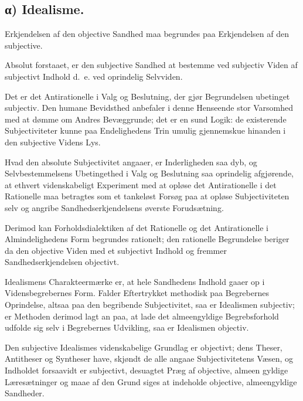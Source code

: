 \documentclass[12pt]{book}
\newcommand{\opage}[1]{\marginnote{\footnotesize\textit{[#1]}}}
\begin{document}
\opage{63} %
\subsection*{α) Idealisme.}

Erkjendelsen af den objective Sandhed maa begrundes paa Erkjendelsen
af den subjective.

Absolut forstaaet, er den subjective Sandhed at bestemme ved
subjectiv Viden af subjectivt Indhold d.~e. ved oprindelig
Selvviden.

Det er det Antirationelle i Valg og Beslutning, der gjør
Begrundelsen ubetinget subjectiv. Den humane Bevidsthed anbefaler i
denne Henseende stor Varsomhed med at dømme om Andres Bevæggrunde;
det er en sund Logik: de existerende Subjectiviteter kunne paa
Endelighedens Trin umulig gjennemskue hinanden i den subjective
Videns Lys.

Hvad den absolute Subjectivitet angaaer, er Inderligheden saa dyb,
og Selvbestemmelsens Ubetingethed i Valg og Beslutning saa
oprindelig afgjørende, at ethvert videnskabeligt Experiment med at
opløse det Antirationelle i det Rationelle maa betragtes som et
tankeløst Forsøg paa at opløse Subjectiviteten selv og angribe
Sandhedserkjendelsens øverste Forudsætning.

Derimod kan Forholdsdialektiken af det Rationelle og det
Antirationelle i Almindelighedens Form begrundes rationelt; den
rationelle Begrundelse beriger da den objective Viden med et
subjectivt Indhold og fremmer Sandhedserkjendelsen objectivt.

Idealismens Charakteermærke er, at hele Sandhedens Indhold gaaer op
i Vidensbegrebernes Form. Falder Eftertrykket methodisk paa
Begrebernes Oprindelse, altsaa paa den begribende Subjectivitet, saa
er Idealismen subjectiv; er Methoden derimod lagt an paa, at lade
det almeengyldige Begrebsforhold udfolde sig selv i Begrebernes
Udvikling, saa er Idealismen objectiv.

Den subjective Idealismes videnskabelige Grundlag er objectivt; dens
Theser, Antitheser og Syntheser have, skjøndt de alle angaae
Subjectivitetens Væsen, og Indholdet forsaavidt er subjectivt,
desuagtet Præg af objective, almeen\-%
\opage{64}gyldige Læresætninger og maae af den Grund siges at indeholde
objective, almeengyldige Sandheder.
\end{document}
